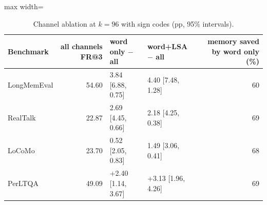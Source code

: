 \begin{table}[H]
\centering
\footnotesize
\caption{Channel ablation at $k=96$ with sign codes (pp, 95\% intervals).}
\label{tab:channels}
\begin{adjustbox}{max width=\linewidth}\begin{tabular}{@{}l r l l r@{}}
\toprule
Benchmark & all channels FR@3 & word only $-$ all & word+LSA $-$ all & memory saved by word only (\%) \\
\midrule
LongMemEval & 54.60 & \textminus{}3.84 [\textminus{}6.88, \textminus{}0.75] & \textminus{}4.40 [\textminus{}7.48, \textminus{}1.28] & 60 \\
RealTalk & 22.87 & \textminus{}2.69 [\textminus{}4.45, \textminus{}0.66] & \textminus{}2.18 [\textminus{}4.25, \textminus{}0.38] & 69 \\
LoCoMo & 23.70 & \textminus{}0.52 [\textminus{}2.05, 0.83] & \textminus{}1.49 [\textminus{}3.06, 0.41] & 68 \\
PerLTQA & 49.09 & +2.40 [1.14, 3.67] & +3.13 [1.96, 4.26] & 69 \\
\bottomrule
\end{tabular}\end{adjustbox}
\end{table}
